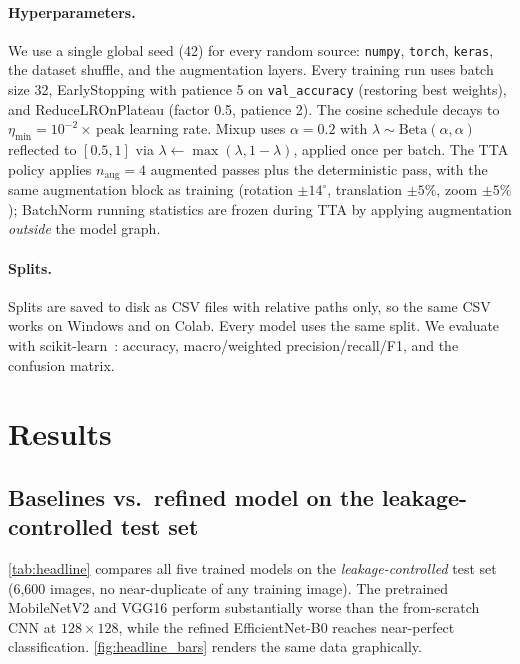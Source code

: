 \documentclass[journal,onecolumn,11pt]{IEEEtran}
\begin{document}
\paragraph{Hyperparameters.}
We use a single global seed (42) for every random source: \verb|numpy|,
\verb|torch|, \verb|keras|, the dataset shuffle, and the augmentation
layers. Every training run uses batch size 32, EarlyStopping with
patience 5 on \verb|val_accuracy| (restoring best weights), and
ReduceLROnPlateau (factor 0.5, patience 2). The cosine schedule decays
to $\eta_{\min} = 10^{-2}\!\times$\,peak learning rate. Mixup uses
$\alpha = 0.2$ with $\lambda \sim \mathrm{Beta}(\alpha, \alpha)$ reflected
to $[0.5, 1]$ via $\lambda \leftarrow \max(\lambda, 1 - \lambda)$, applied
once per batch. The TTA policy applies $n_{\text{aug}} = 4$ augmented passes
plus the deterministic pass, with the same augmentation block as training
(rotation $\pm 14^{\circ}$, translation $\pm 5\%$, zoom $\pm 5\%$); BatchNorm
running statistics are frozen during TTA by applying augmentation
\emph{outside} the model graph.

\paragraph{Splits.}
Splits are saved to disk as CSV files with relative paths only, so the
same CSV works on Windows and on Colab. Every model uses the same split.
We evaluate with scikit-learn~\cite{pedregosa2011sklearn}: accuracy,
macro/weighted precision/recall/F1, and the confusion matrix.

\section{Results}
\label{sec:results}

\subsection{Baselines vs.\ refined model on the leakage-controlled test set}

\cref{tab:headline} compares all five trained models on the
\emph{leakage-controlled} test set (6{,}600 images, no near-duplicate of any
training image). The pretrained MobileNetV2 and VGG16 perform substantially
worse than the from-scratch CNN at $128{\times}128$, while the refined
EfficientNet-B0 reaches near-perfect classification.
\cref{fig:headline_bars} renders the same data graphically.
\end{document}
